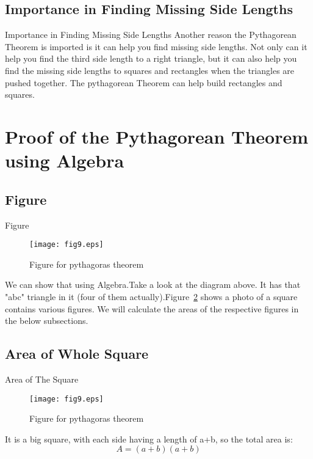 \documentclass[10pt]{beamer}
\begin{document}
\subsection{Importance in Finding Missing Side Lengths}
\begin{frame}{Importance in Finding Missing Side Lengths}
\transfade
Another reason the Pythagorean Theorem is imported is it can help you find missing side lengths. Not only can it help you find the third side length to a right triangle, but it can also help you find the missing side lengths to squares and rectangles when the triangles are pushed together. The pythagorean Theorem can help build rectangles and squares.
\end{frame}

\section{Proof of the Pythagorean Theorem using Algebra}
\label{sec:proof}
\subsection{Figure}
\begin{frame}{Figure}
\begin{figure}[htb!]
  \begin{center}
    \texttt{[image: fig9.eps]}
   \end{center}
  \caption{Figure for pythagoras theorem}
  \label{image1}
\end{figure}
We can show that using Algebra.Take a look at the diagram above. It has that "abc" triangle in it (four of them actually).Figure~\ref{image1} shows a photo of a square contains various figures. We will calculate the areas of the respective figures in the below subsections.
\transfade
\end{frame}

\subsection{Area of Whole Square}
\label{a_square}
\begin{frame}{Area of The Square}
\begin{figure}[htb!]
  \begin{center}
    \texttt{[image: fig9.eps]}
   \end{center}
  \caption{Figure for pythagoras theorem}
  \label{image1}
\end{figure}
\transfade
It is a big square, with each side having a length of a+b, so the total area is:
$$A = (a+b)(a+b)$$
\end{frame}
\end{document}
